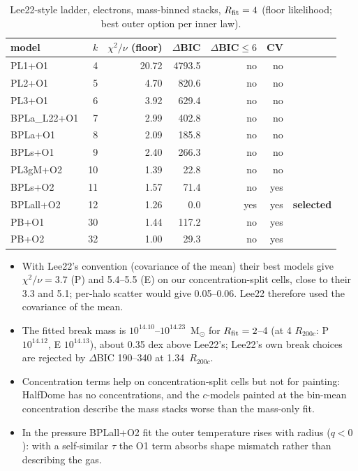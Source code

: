 \documentclass[10pt,a4paper]{article}
\newcommand{\Rc}{R_{200c}}
\newcommand{\Rfit}{R_{\rm fit}}
\begin{document}
\begin{table}[H]
\centering
\footnotesize
\caption{Lee22-style ladder, electrons, mass-binned stacks, $R_{\rm fit}=4$ (floor likelihood; best outer option per inner law).}
\label{tab:ladderE}
\begin{tabular}{lrrrrrr}
\toprule
model & $k$ & $\chi^2/\nu$ (floor) & $\Delta$BIC & $\Delta$BIC$\le6$ & CV &  \\
\midrule
PL1+O1 & 4 & 20.72 & 4793.5 & no & no &  \\
PL2+O1 & 5 & 4.70 & 820.6 & no & no &  \\
PL3+O1 & 6 & 3.92 & 629.4 & no & no &  \\
BPLa\_L22+O1 & 7 & 2.99 & 402.8 & no & no &  \\
BPLa+O1 & 8 & 2.09 & 185.8 & no & no &  \\
BPLs+O1 & 9 & 2.40 & 266.3 & no & no &  \\
PL3gM+O2 & 10 & 1.39 & 22.8 & no & no &  \\
BPLs+O2 & 11 & 1.57 & 71.4 & no & yes &  \\
BPLall+O2 & 12 & 1.26 & 0.0 & yes & yes & \textbf{selected} \\
PB+O1 & 30 & 1.44 & 117.2 & no & yes &  \\
PB+O2 & 32 & 1.00 & 29.3 & no & yes &  \\
\bottomrule
\end{tabular}
\end{table}
\begin{itemize}
\item With Lee22's convention (covariance of the mean) their best models give $\chi^2/\nu=3.7$ (P) and 5.4--5.5 (E) on our
  concentration-split cells, close to their 3.3 and 5.1; per-halo scatter would give 0.05--0.06. Lee22 therefore used the
  covariance of the mean.
\item The fitted break mass is $10^{14.10}$--$10^{14.23}$~M$_\odot$ for $\Rfit=2$--4 (at 4 $R_{200c}$: P $10^{14.12}$, E $10^{14.13}$), about 0.35 dex above Lee22's;
  Lee22's own break choices are rejected by $\Delta$BIC 190--340 at 1.34~$\Rc$.
\item Concentration terms help on concentration-split cells but not for painting: HalfDome has no concentrations, and the
  $c$-models painted at the bin-mean concentration describe the mass stacks worse than the mass-only fit.
\item In the pressure BPLall+O2 fit the outer temperature rises with radius ($q<0$): with a self-similar $\tau$ the O1 term
  absorbs shape mismatch rather than describing the gas.
\end{itemize}
\end{document}
